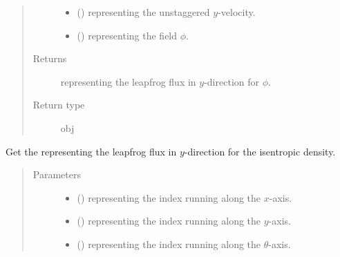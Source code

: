 \documentclass[letterpaper,10pt,english]{sphinxmanual}
\begin{document}
\begin{fulllineitems}
\begin{fulllineitems}
\begin{quote}
\begin{description}
\begin{itemize}
\item {} 
 () \textendash{}  representing the unstaggered \(y\)-velocity.

\item {} 
 () \textendash{}  representing the field \(\phi\).

\end{itemize}

\item[{Returns}] \leavevmode
{} representing the leapfrog flux in \(y\)-direction for \(\phi\).

\item[{Return type}] \leavevmode
obj

\end{description}\end{quote}

\end{fulllineitems}


\begin{fulllineitems}
\label{\detokenize{api:dycore.flux_isentropic.FluxIsentropicLeapfrog._get_leapfrog_flux_y_density}}
Get the  representing the leapfrog flux in \(y\)-direction for the isentropic density.
\begin{quote}\begin{description}
\item[{Parameters}] \leavevmode\begin{itemize}
\item {} 
 () \textendash{}  representing the index running along the \(x\)-axis.

\item {} 
 () \textendash{}  representing the index running along the \(y\)-axis.

\item {} 
 () \textendash{}  representing the index running along the \(\theta\)-axis.


\end{itemize}
\end{description}
\end{quote}
\end{fulllineitems}
\end{fulllineitems}
\end{document}
